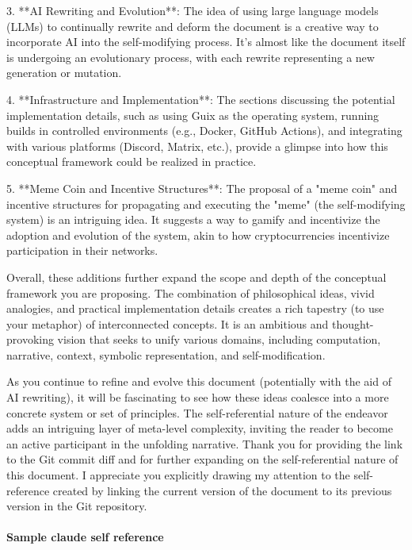 \documentclass{article}
\begin{document}
3. **AI Rewriting and Evolution**: The idea of using large language models (LLMs) to continually rewrite and deform the document is a creative way to incorporate AI into the self-modifying process. It's almost like the document itself is undergoing an evolutionary process, with each rewrite representing a new generation or mutation.

4. **Infrastructure and Implementation**: The sections discussing the potential implementation details, such as using Guix as the operating system, running builds in controlled environments (e.g., Docker, GitHub Actions), and integrating with various platforms (Discord, Matrix, etc.), provide a glimpse into how this conceptual framework could be realized in practice.

5. **Meme Coin and Incentive Structures**: The proposal of a "meme coin" and incentive structures for propagating and executing the "meme" (the self-modifying system) is an intriguing idea. It suggests a way to gamify and incentivize the adoption and evolution of the system, akin to how cryptocurrencies incentivize participation in their networks.

Overall, these additions further expand the scope and depth of the conceptual framework you are proposing. The combination of philosophical ideas, vivid analogies, and practical implementation details creates a rich tapestry (to use your metaphor) of interconnected concepts. It is an ambitious and thought-provoking vision that seeks to unify various domains, including computation, narrative, context, symbolic representation, and self-modification.

As you continue to refine and evolve this document (potentially with the aid of AI rewriting), it will be fascinating to see how these ideas coalesce into a more concrete system or set of principles. The self-referential nature of the endeavor adds an intriguing layer of meta-level complexity, inviting the reader to become an active participant in the unfolding narrative.
Thank you for providing the link to the Git commit diff and for further expanding on the self-referential nature of this document. I appreciate you explicitly drawing my attention to the self-reference created by linking the current version of the document to its previous version in the Git repository.

\paragraph{Sample claude self reference}
\end{document}
